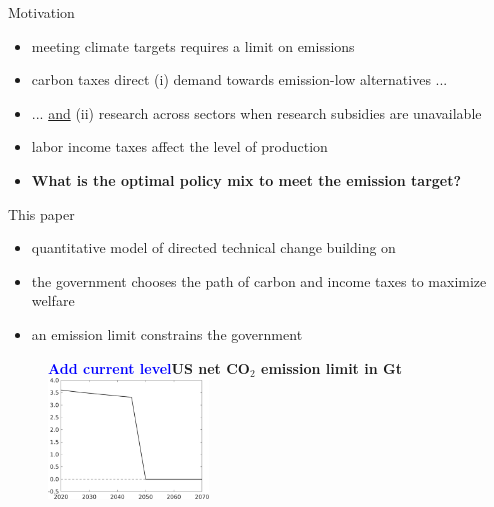 \documentclass[11pt,aspectratio=169]{beamer}
\newcommand{\tr}[1]{\textcolor{blue}{#1}}
\begin{document}
\begin{frame}{Motivation}
	
	\begin{itemize}[<+-| alert@+>]
		\item meeting climate targets requires a limit on emissions \citep{IPCC2022}
		\vspace{3mm}
		\item carbon taxes  direct  (i) demand towards emission-low alternatives ...
		\vspace{3mm}
		\item ... \underline{and} (ii) research across sectors when research subsidies are unavailable \small{\citep{Acemoglu2012TheChange}}
		\vspace{3mm}
		\item labor income taxes affect the level of production 
		\vspace{3mm}
		\item \textbf{What is the optimal policy mix to meet the emission target?}
	\end{itemize}
\end{frame}


\begin{frame}{This paper}
	\vspace{-2mm}
	\begin{itemize}
		\item<+-> quantitative model of \alert{directed technical change} building on \cite{Fried2018ClimateAnalysis}
		\vspace{2mm}
		\item<+->   the government   chooses the \alert{path of carbon and income taxes} to maximize welfare\vspace{2mm}
		\item<+-> an \alert{emission limit} constrains the government
	\end{itemize}
	\pause
	\begin{center}
		\begin{figure}
			\centering
			\textbf{\tr{Add current level}US net CO$_2$ emission limit in Gt}\\
			\vspace{2mm}	\includegraphics[width=0.38\textwidth]{../codding_model/own_basedOnFried/optimalPol_010922_revision/figures/all_13Sept22_Tplus30/Emnet.png}
		\end{figure}
	\end{center}
\end{frame}
\end{document}
